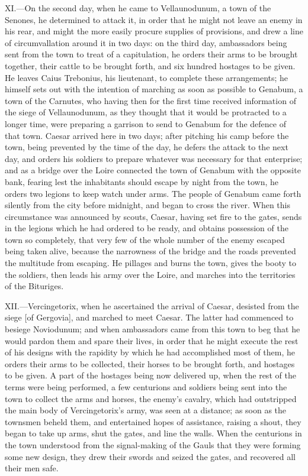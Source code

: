 XI.—On the second day, when he came to Vellaunodunum, a town of the
Senones, he determined to attack it, in order that he might not leave an
enemy in his rear, and might the more easily procure supplies of
provisions, and drew a line of circumvallation around it in two days: on
the third day, ambassadors being sent from the town to treat of a
capitulation, he orders their arms to be brought together, their cattle
to be brought forth, and six hundred hostages to be given. He leaves
Caius Trebonius, his lieutenant, to complete these arrangements; he
himself sets out with the intention of marching as soon as possible to
Genabum, a town of the Carnutes, who having then for the first time
received information of the siege of Vellaunodunum, as they thought that
it would be protracted to a longer time, were preparing a garrison to
send to Genabum for the defence of that town. Caesar arrived here in two
days; after pitching his camp before the town, being prevented by the
time of the day, he defers the attack to the next day, and orders his
soldiers to prepare whatever was necessary for that enterprise; and as a
bridge over the Loire connected the town of Genabum with the opposite
bank, fearing lest the inhabitants should escape by night from the town,
he orders two legions to keep watch under arms. The people of Genabum
came forth silently from the city before midnight, and began to cross
the river. When this circumstance was announced by scouts, Caesar,
having set fire to the gates, sends in the legions which he had ordered
to be ready, and obtains possession of the town so completely, that very
few of the whole number of the enemy escaped being taken alive, because
the narrowness of the bridge and the roads prevented the multitude from
escaping. He pillages and burns the town, gives the booty to the
soldiers, then leads his army over the Loire, and marches into the
territories of the Bituriges.

XII.—Vercingetorix, when he ascertained the arrival of Caesar, desisted
from the siege [of Gergovia], and marched to meet Caesar. The latter had
commenced to besiege Noviodunum; and when ambassadors came from this
town to beg that he would pardon them and spare their lives, in order
that he might execute the rest of his designs with the rapidity by which
he had accomplished most of them, he orders their arms to be collected,
their horses to be brought forth, and hostages to be given. A part of
the hostages being now delivered up, when the rest of the terms were
being performed, a few centurions and soldiers being sent into the town
to collect the arms and horses, the enemy's cavalry, which had
outstripped the main body of Vercingetorix's army, was seen at a
distance; as soon as the townsmen beheld them, and entertained hopes of
assistance, raising a shout, they began to take up arms, shut the gates,
and line the walls. When the centurions in the town understood from the
signal-making of the Gauls that they were forming some new design, they
drew their swords and seized the gates, and recovered all their men
safe.


